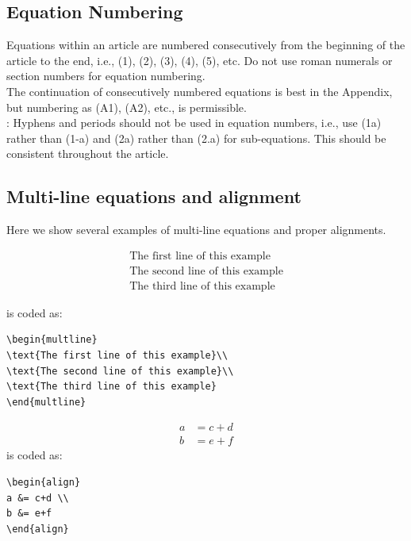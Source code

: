 \documentclass[lettersize,journal]{IEEEtran}
\begin{document}
\subsection{Equation Numbering}
 Equations within an article are numbered consecutively from the beginning of the
article to the end, i.e., (1), (2), (3), (4), (5), etc. Do not use roman numerals or section numbers for equation numbering.\\

 The continuation of consecutively numbered equations is best in the Appendix, but numbering
 as (A1), (A2), etc., is permissible.\\

: Hyphens and periods should not be used in equation numbers, i.e., use (1a) rather than
(1-a) and (2a) rather than (2.a) for sub-equations. This should be consistent throughout the article.

\subsection{Multi-line equations and alignment}
\noindent Here we show several examples of multi-line equations and proper alignments.

\begin{multline}
\text{The first line of this example}\\
\text{The second line of this example}\\
\text{The third line of this example}
\end{multline}

\noindent is coded as:
\begin{verbatim}
\begin{multline}
\text{The first line of this example}\\
\text{The second line of this example}\\
\text{The third line of this example}
\end{multline}
\end{verbatim}

\begin{align}
a &= c+d \\
b &= e+f
\end{align}
\noindent is coded as:
\begin{verbatim}
\begin{align}
a &= c+d \\
b &= e+f
\end{align}
\end{verbatim}
\end{document}

